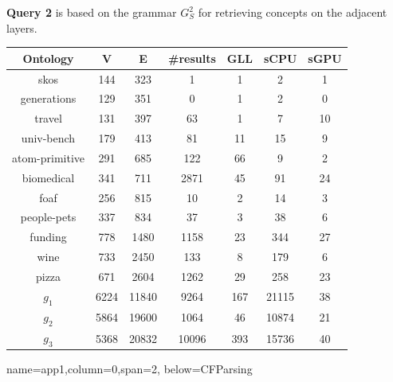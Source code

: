 \documentclass[a0paper,portrait]{baposter}
\begin{document}
\begin{poster}
{\begin{center}
\vspace{0.2cm}
\textbf{Query 2} is based on the grammar $G^2_S$ for retrieving concepts on the adjacent layers.
\begin{tabular}{ | c | c | c | c | c | c | c |}
	\hline
	Ontology & V & E & \#results & GLL & sCPU & sGPU\\
	\hline 
	\hline
	skos        & 144 & 323 & 1 & 1 & 2 & 1\\
	generations & 129 & 351 & 0 & 1 & 2 & 0\\
	travel      & 131 & 397 & 63 & 1 & 7 & 10\\
	univ-bench  & 179 & 413 & 81 & 11 & 15 & 9\\
	atom-primitive & 291 & 685 & 122 & 66 & 9 & 2\\
	biomedical & 341 & 711 & 2871 & 45 & 91 & 24\\
	foaf        & 256 & 815 & 10 & 2 & 14 & 3\\
	people-pets & 337 & 834 & 37 & 3 & 38 & 6\\
	funding     & 778 & 1480 & 1158 & 23 & 344 & 27\\
	wine        & 733 & 2450 & 133 & 8 & 179 & 6\\
	pizza       & 671 & 2604 & 1262 & 29 & 258 & 23\\
	$g_{1}$     & 6224 & 11840 & 9264 & 167 & 21115 & 38\\
	$g_{2}$     & 5864 & 19600 & 1064 & 46 & 10874 & 21\\
	$g_{3}$     & 5368 & 20832 & 10096 & 393 & 15736 & 40\\
	\hline
\end{tabular}
\end{center}
}
    


{name=app1,column=0,span=2, below=CFParsing}
{ %
}



\end{poster}
\end{document}
